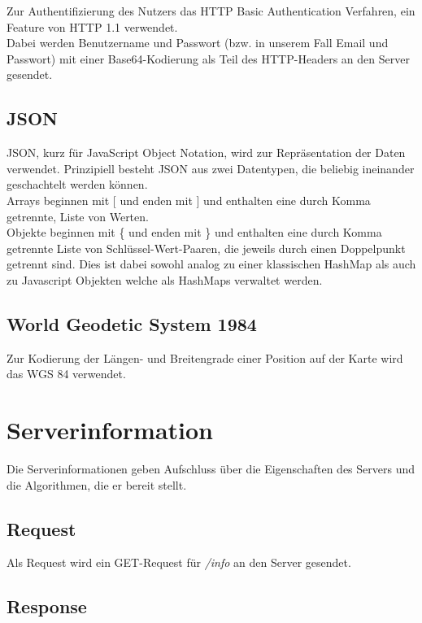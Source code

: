 \documentclass[ngerman]{scrartcl}
\begin{document}
	Zur Authentifizierung des Nutzers das HTTP Basic Authentication Verfahren, ein Feature von HTTP 1.1 verwendet.\\
	Dabei werden Benutzername und Passwort (bzw. in unserem Fall Email und Passwort) mit einer Base64-Kodierung als Teil des HTTP-Headers an den Server gesendet.
	
	\subsection{JSON}
	
	JSON, kurz für JavaScript Object Notation, wird zur Repräsentation der Daten verwendet.
	Prinzipiell besteht JSON aus zwei Datentypen, die beliebig ineinander geschachtelt werden können. \\
	Arrays beginnen mit [ und enden mit ] und enthalten eine durch Komma getrennte, Liste von Werten. \\
	Objekte beginnen mit \{ und enden mit \} und enthalten eine durch Komma getrennte Liste von Schlüssel-Wert-Paaren, die jeweils durch einen Doppelpunkt getrennt sind.
	Dies ist dabei sowohl analog zu einer klassischen HashMap als auch zu Javascript Objekten welche als HashMaps verwaltet werden.
	
	\subsection{World Geodetic System 1984}
	
	Zur Kodierung der Längen- und Breitengrade einer Position auf der Karte wird das WGS 84 verwendet.

\section{Serverinformation}

	Die Serverinformationen geben Aufschluss über die Eigenschaften des Servers und die Algorithmen, die er bereit stellt.

	\subsection*{Request}
	
	Als Request wird ein GET-Request für \textit{/info} an den Server gesendet.
	
	\subsection*{Response}
	
\end{document}
